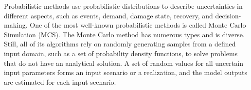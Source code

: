     Probabilistic methods use probabilistic distributions to describe uncertainties in different aspects, such as events, demand, damage state, recovery, and decision-making. One of the most well-known probabilistic methods is called Monte Carlo Simulation (MCS). The Monte Carlo method has numerous types and is diverse. Still, all of its algorithms rely on randomly generating samples from a defined input domain, such as a set of probability density functions, to solve problems that do not have an analytical solution. A set of random values for all uncertain input parameters forms an input scenario or a realization, and the model outputs are estimated for each input scenario.\\

    